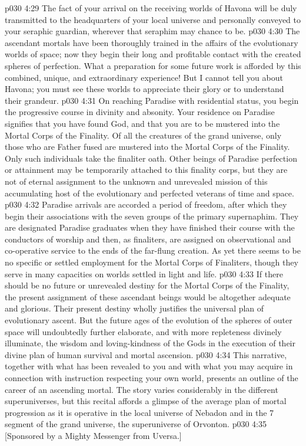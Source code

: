 \vs p030 4:29 The fact of your arrival on the receiving worlds of Havona will be duly transmitted to the headquarters of your local universe and personally conveyed to your seraphic guardian, wherever that seraphim may chance to be.
\vs p030 4:30 The ascendant mortals have been thoroughly trained in the affairs of the evolutionary worlds of space; now they begin their long and profitable contact with the created spheres of perfection. What a preparation for some future work is afforded by this combined, unique, and extraordinary experience! But I cannot tell you about Havona; you must see these worlds to appreciate their glory or to understand their grandeur.
\vs p030 4:31 \bibnobreakspace {} On reaching Paradise with residential status, you begin the progressive course in divinity and absonity. Your residence on Paradise signifies that you have found God, and that you are to be mustered into the Mortal Corps of the Finality. Of all the creatures of the grand universe, only those who are Father fused are mustered into the Mortal Corps of the Finality. Only such individuals take the finaliter oath. Other beings of Paradise perfection or attainment may be temporarily attached to this finality corps, but they are not of eternal assignment to the unknown and unrevealed mission of this accumulating host of the evolutionary and perfected veterans of time and space.
\vs p030 4:32 Paradise arrivals are accorded a period of freedom, after which they begin their associations with the seven groups of the primary supernaphim. They are designated Paradise graduates when they have finished their course with the conductors of worship and then, as finaliters, are assigned on observational and co\hyp{}operative service to the ends of the far\hyp{}flung creation. As yet there seems to be no specific or settled employment for the Mortal Corps of Finaliters, though they serve in many capacities on worlds settled in light and life.
\vs p030 4:33 If there should be no future or unrevealed destiny for the Mortal Corps of the Finality, the present assignment of these ascendant beings would be altogether adequate and glorious. Their present destiny wholly justifies the universal plan of evolutionary ascent. But the future ages of the evolution of the spheres of outer space will undoubtedly further elaborate, and with more repleteness divinely illuminate, the wisdom and loving\hyp{}kindness of the Gods in the execution of their divine plan of human survival and mortal ascension.
\vs p030 4:34 \pc This narrative, together with what has been revealed to you and with what you may acquire in connection with instruction respecting your own world, presents an outline of the career of an ascending mortal. The story varies considerably in the different superuniverses, but this recital affords a glimpse of the average plan of mortal progression as it is operative in the local universe of Nebadon and in the 7 segment of the grand universe, the superuniverse of Orvonton.
\vsetoff
\vs p030 4:35 [Sponsored by a Mighty Messenger from Uversa.]
\quizlink
